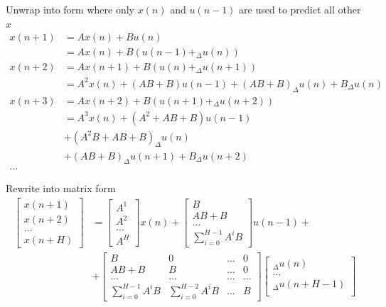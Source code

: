 \documentclass[12pt,twoside,onecolumn,openany,extrafontsizes,dvipsnames]{memoir}
\begin{document}
        Unwrap into form where only $x(n)$ and $u(n-1)$ are used to predict all other $x$
        \begin{align*}
            x(n+1)&= Ax(n) + Bu(n) \\
                &= Ax(n) + B(u(n-1) + _\Delta u(n)) \\
            x(n+2)&= Ax(n+1) + B(u(n) + _\Delta u(n+1)) \\
                &= A^2x(n) + (AB + B)u(n-1) + (AB+B)_\Delta u(n) + B_\Delta u(n) \\
            x(n+3)&= Ax(n+2) + B(u(n+1) + _\Delta u(n+2)) \\
                &= A^3x(n) + (A^2 + AB + B)u(n-1) \\
                & + (A^2B + AB + B)_\Delta u(n) \\
                & + (AB + B)_\Delta u(n+1) + B_\Delta u(n+2) \\
            ... 
        \end{align*}  


        Rewrite into matrix form
        \begin{align*}
            \begin{bmatrix}
            x(n+1) \\
            x(n+2) \\
            \dots \\
            x(n+H)
            \end{bmatrix} &= 
            \begin{bmatrix}
            A^1 \\
            A^2 \\
            \dots \\
            A^H
            \end{bmatrix} x(n) +
            \begin{bmatrix}
            B \\
            AB + B \\
            \dots \\
            \sum_{i=0}^{H-1} A^iB
            \end{bmatrix} u(n-1) + \\
            &+
            \begin{bmatrix}
            B  & 0 & \dots & 0 \\
            AB + B & B & \dots & 0 \\
            \dots & \dots & \dots & \dots \\
            \sum_{i=0}^{H-1}A^iB & \sum_{i=0}^{H-2}A^iB & \dots & B
            \end{bmatrix}
            \begin{bmatrix}
            _\Delta u(n) \\
            \dots \\
            _\Delta u(n + H - 1) \\
            \end{bmatrix} 
        \end{align*}
\end{document}
